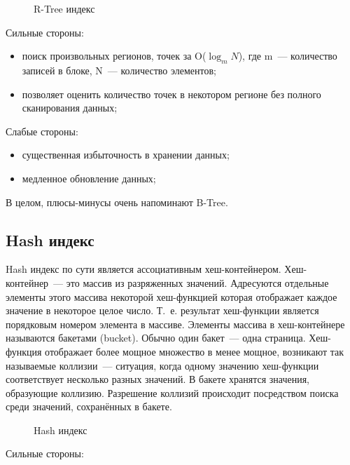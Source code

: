\begin{figure}[ht!]
  \caption{R-Tree индекс}
  \label{fig:rtree_index}
\end{figure}

Сильные стороны:

\begin{itemize}
  \item поиск произвольных регионов, точек за O($\log_m{N}$), где m~--- количество записей в блоке, N~--- количество элементов;
  \item позволяет оценить количество точек в некотором регионе без полного сканирования данных;
\end{itemize}

Слабые стороны:

\begin{itemize}
  \item существенная избыточность в хранении данных;
  \item медленное обновление данных;
\end{itemize}

В целом, плюсы-минусы очень напоминают B-Tree.




\subsection{Hash индекс}

Hash индекс по сути является ассоциативным хеш-контейнером. Хеш-контейнер~--- это массив из разряженных значений. Адресуются отдельные элементы этого массива некоторой хеш-функцией которая отображает каждое значение в некоторое целое число. Т.~е. результат хеш-функции является порядковым номером элемента в массиве. Элементы массива в хеш-контейнере называются бакетами (bucket). Обычно один бакет~--- одна страница. Хеш-функция отображает более мощное множество в менее мощное, возникают так называемые коллизии~--- ситуация, когда одному значению хеш-функции соответствует несколько разных значений. В бакете хранятся значения, образующие коллизию. Разрешение коллизий происходит посредством поиска среди значений, сохранённых в бакете.

\begin{figure}[ht!]
  \caption{Hash индекс}
  \label{fig:hash_index}
\end{figure}

Сильные стороны:

